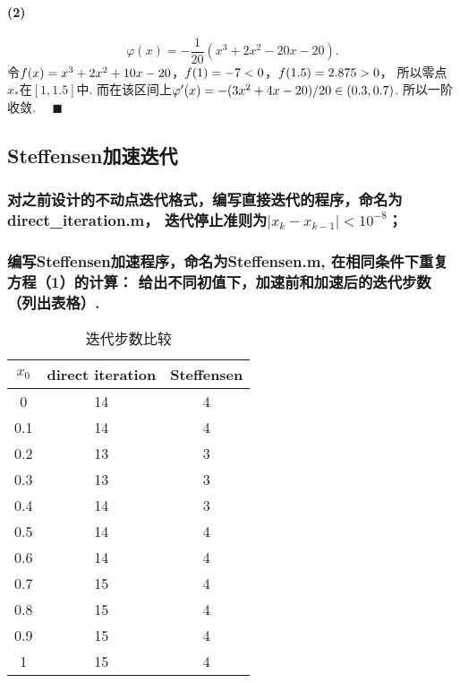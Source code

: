   \paragraph{(2)}
    \[
      \varphi(x) = -\frac{1}{20}(x^3+2x^2-20x-20).
    \]
    令$\mathnormal{f}(x)=x^3+2x^2+10x-20$，$\mathnormal{f}(1)=-7<0$，$\mathnormal{f}(1.5)=2.875>0$，
    所以零点$x_*$在$[1, 1.5]$中. 而在该区间上$\varphi^{\prime}(x)
    =-(3x^2 + 4x - 20)/20 \in (0.3, 0.7)$. 所以一阶收敛. $\quad\blacksquare$

\vspace{1cm}
\subsection{Steffensen加速迭代}
\subsubsection{对之前设计的不动点迭代格式，编写直接迭代的程序，命名为direct\_iteration.m，
迭代停止准则为$|x_k - x_{k-1}| < 10^{-8}$；}
  
  

\subsubsection{编写Steffensen加速程序，命名为Steffensen.m, 在相同条件下重复方程（1）的计算：
给出不同初值下，加速前和加速后的迭代步数（列出表格）.}
  
  
  \begin{table}[htbp]
    \caption{迭代步数比较}
    \centering
    \begin{tabular}{c|cc}
      \toprule
      $x_0$ & direct iteration & Steffensen \\
      \midrule
      0	& 14	& 4 \\
      0.1	& 14	& 4 \\
      0.2	& 13	& 3\\
      0.3	& 13	& 3\\
      0.4	& 14&	3 \\
      0.5	& 14&	4\\
      0.6	&14	&4 \\
      0.7	&15	&4\\
      0.8	&15	&4\\
      0.9	&15	&4 \\
      1	  &15	&4 \\
      \bottomrule
    \end{tabular}
  \end{table}

